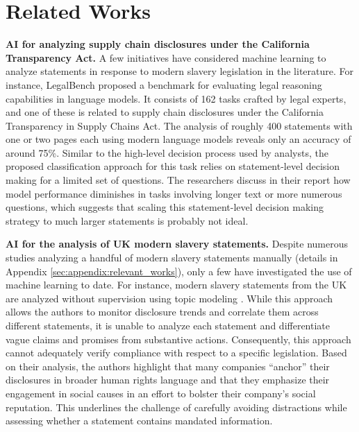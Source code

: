 \section{Related Works}
\label{sec:relworks}


\textbf{AI for analyzing supply chain disclosures under the California Transparency Act.} A few initiatives have considered machine learning to analyze statements in response to modern slavery legislation in the literature. For instance, LegalBench \citep{guha2023legalbench} proposed a benchmark for evaluating legal reasoning capabilities in language models. It consists of 162 tasks crafted by legal experts, and one of these is related to supply chain disclosures under the California Transparency in Supply Chains Act. The analysis of roughly 400 statements with one or two pages each using modern language models reveals only an accuracy of around 75\%. Similar to the high-level decision process used by analysts, the proposed classification approach for this task relies on statement-level decision making for a limited set of questions. The researchers discuss in their report how model performance diminishes in tasks involving longer text or more numerous questions, which suggests that scaling this statement-level decision making strategy to much larger statements is probably not ideal.

\textbf{AI for the analysis of UK modern slavery statements.} Despite numerous studies analyzing a handful of modern slavery statements manually (details in Appendix \ref{sec:appendix:relevant_works}), only a few have investigated the use of machine learning to date. For instance, modern slavery statements from the UK are analyzed without supervision using topic modeling \citep{nersessian2022human, bora2019augmentedintelligence}. While this approach allows the authors to monitor disclosure trends and correlate them across different statements, it is unable to analyze each statement and differentiate vague claims and promises from substantive actions. Consequently, this approach cannot adequately verify compliance with respect to a specific legislation. Based on their analysis, the authors highlight that many companies ``anchor'' their disclosures in broader human rights language and that they emphasize their engagement in social causes in an effort to bolster their company's social reputation. This underlines the challenge of carefully avoiding distractions while assessing whether a statement contains mandated information.


